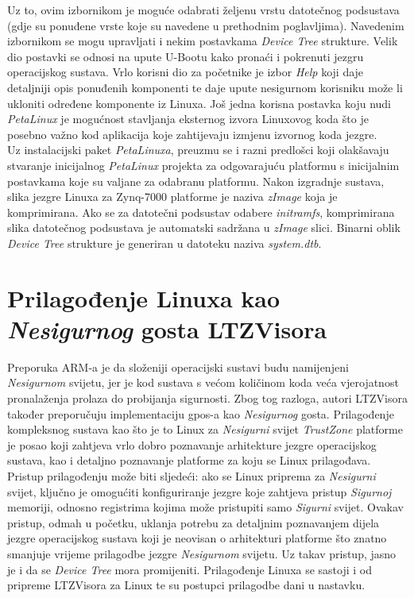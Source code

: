\documentclass[times, utf8, diplomski, numeric]{fer}
\begin{document}
Uz to, ovim izbornikom je moguće odabrati željenu vrstu datotečnog podsustava (gdje su ponuđene vrste koje su navedene u
prethodnim poglavljima). Navedenim izbornikom se mogu upravljati i nekim postavkama \textit{Device Tree} strukture. Velik dio
postavki se odnosi na upute U-Bootu kako pronaći i pokrenuti jezgru operacijskog sustava. Vrlo korisni dio za početnike je
izbor \textit{Help} koji daje detaljniji opis ponuđenih komponenti te daje upute nesigurnom korisniku može li ukloniti
određene komponente iz Linuxa. Još jedna korisna postavka koju nudi \textit{PetaLinux} je mogućnost stavljanja eksternog
izvora Linuxovog koda što je posebno važno kod aplikacija koje zahtijevaju izmjenu izvornog koda jezgre.\\
Uz instalacijski paket \textit{PetaLinuxa}, preuzmu se i razni predlošci koji olakšavaju stvaranje inicijalnog
\textit{PetaLinux} projekta za odgovarajuću platformu s inicijalnim postavkama koje su valjane za odabranu platformu. Nakon
izgradnje sustava, slika jezgre Linuxa za Zynq-7000 platforme je naziva \textit{zImage} koja je komprimirana. Ako se
za datotečni podsustav odabere \textit{initramfs}, komprimirana slika datotečnog podsustava je automatski sadržana u
\textit{zImage} slici. Binarni oblik \textit{Device Tree} strukture je generiran u datoteku naziva \textit{system.dtb}.

\section{Prilagođenje Linuxa kao \textit{Nesigurnog} gosta LTZVisora}
Preporuka ARM-a je da složeniji operacijski sustavi budu namijenjeni \textit{Nesigurnom} svijetu, jer je kod sustava s većom
količinom koda veća vjerojatnost pronalaženja prolaza do probijanja sigurnosti. Zbog tog razloga, autori LTZVisora također
preporučuju implementaciju \gls{gpos}-a kao \textit{Nesigurnog} gosta. Prilagođenje kompleksnog sustava kao što je to Linux za \textit{Nesigurni}
svijet \textit{TrustZone} platforme je posao koji zahtjeva vrlo dobro poznavanje arhitekture jezgre operacijskog sustava, kao
i detaljno poznavanje platforme za koju se Linux prilagođava. Pristup prilagođenju može biti sljedeći: ako se Linux priprema
za \textit{Nesigurni} svijet, ključno je omogućiti konfiguriranje jezgre koje zahtjeva pristup \textit{Sigurnoj} memoriji, odnosno registrima
kojima može pristupiti samo \textit{Sigurni} svijet. Ovakav pristup, odmah u početku, uklanja potrebu za detaljnim poznavanjem
dijela jezgre operacijskog sustava koji je neovisan o arhitekturi platforme što znatno smanjuje vrijeme prilagodbe jezgre
\textit{Nesigurnom} svijetu. Uz takav pristup, jasno je i da se \textit{Device Tree} mora promijeniti. Prilagođenje Linuxa se sastoji
i od pripreme LTZVisora za Linux te su postupci prilagodbe dani u nastavku.
\end{document}
